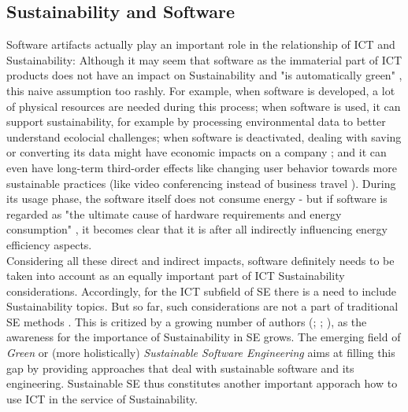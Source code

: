 \documentclass[oribibl]{llncs}
\begin{document}
\subsection{Sustainability and Software\label{SustSW}}
Software artifacts actually play an important role in the relationship of ICT and Sustainability: Although it may seem that software as the immaterial part of ICT products does not have an impact on Sustainability and "is automatically green" \cite[p.\,3]{agarwal_sustainable_2012}, this naive assumption too rashly. For example, when software is developed, a lot of physical resources are needed during this process; when software is used, it can support sustainability, for example by processing environmental data to better understand ecolocial challenges; when software is deactivated, dealing with saving or converting its data might have economic impacts on a company \cite{johann_sustainable_2011}; and it can even have long-term third-order effects like changing user behavior towards more sustainable practices (like video conferencing instead of business travel \cite{amsel_toward_2011}). During its usage phase, the software itself does not consume energy - but if software is regarded as "the ultimate cause of hardware requirements and energy consumption" \cite[p.\,1]{kern_impacts_2015}, it becomes clear that it is after all indirectly influencing energy efficiency aspects.\\
Considering all these direct and indirect impacts, software definitely needs to be taken into account as an equally important part of ICT Sustainability considerations. Accordingly, for the ICT subfield of SE there is a need to include Sustainability topics. But so far, such considerations are not a part of traditional SE methods \cite{penzenstadler_supporting_2012}. This is critized by a growing number of authors (\cite{penzenstadler_supporting_2012}; \cite{agarwal_sustainable_2012}; \cite{amsel_toward_2011}), as the awareness for the importance of Sustainability in SE grows. The emerging field of \textit{Green} or (more holistically) \textit{Sustainable Software Engineering} %
aims at filling this gap by providing approaches that deal with sustainable software and its engineering. Sustainable SE thus constitutes another important apporach how to use ICT in the service of Sustainability. %
\end{document}
